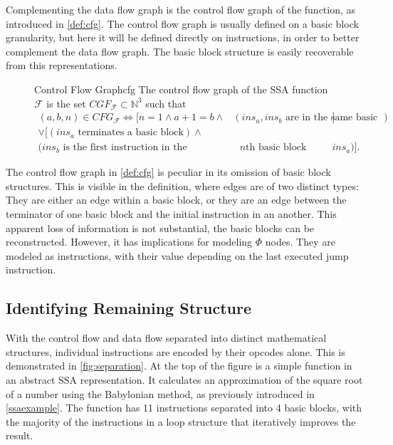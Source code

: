     Complementing the data flow graph is the control flow graph of the function,
    as introduced in \autoref{def:cfg}.
    The control flow graph is usually defined on a basic block granularity, but
    here it will be defined directly on instructions, in order to better
    complement the data flow graph.
    The basic block structure is easily recoverable from this representations.

\begin{figure}[h]
\begin{definition}{Control Flow Graph}{cfg}
    The control flow graph of the SSA function $\mathcal F$ is the set
    $CGF_{\mathcal F}\subset \mathbb N^3$ such that
    \begin{align*}
        (a,b,n)\in CFG_{\mathcal F}\iff[n=1\land a+1=b\land&(ins_a,ins_b\text{ are in the same basic block})] \\
                                   \lor[(ins_a\text{ terminates a basic block})\land&\\
                                        (ins_b\text{ is the first instruction in the}&\text{ $n$th basic block argument of }ins_a)].
    \end{align*}
\end{definition}
\end{figure}

    The control flow graph in \autoref{def:cfg} is peculiar in its omission of
    basic block structures.
    This is visible in the definition, where edges are of two distinct types:
    They are either an edge within a basic block, or they are an edge between
    the terminator of one basic block and the initial instruction in an another.
    This apparent loss of information is not substantial, the basic blocks can
    be reconstructed.
    However, it has implications for modeling $\Phi$ nodes.
    They are modeled as instructions, with their value depending on the last
    executed jump instruction.

\subsection{Identifying Remaining Structure}

    With the control flow and data flow separated into distinct mathematical
    structures, individual instructions are encoded by their opcodes alone.
    This is demonstrated in \autoref{fig:separation}.
    At the top of the figure is a simple function in an abstract SSA
    representation.
    It calculates an approximation of the square root of a number using the
    Babylonian method, as previously introduced in \autoref{ssaexample}.
    The function has 11 instructions separated into 4 basic blocks, with the
    majority of the instructions in a loop structure that iteratively improves
    the result.

